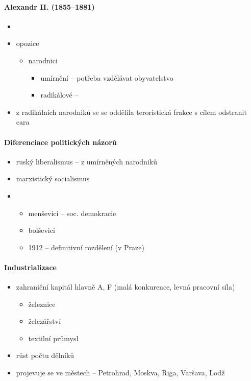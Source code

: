 \paragraph{Alexandr II. (1855--1881)}
\begin{itemize}
\item {}
\item opozice
	\begin{itemize}
	\item narodnici
		\begin{itemize}
		\item umírnění -- potřeba vzdělávat obyvatelstvo
		\item radikálové -- 
		\end{itemize}
		
	\end{itemize}
\item z radikálních narodniků se se oddělila teroristická frakce s cílem odstranit cara \ra {}
\end{itemize}

\paragraph{Diferenciace politických názorů}
\begin{itemize}
\item ruský liberalismus -- z umírněných narodniků
\item marxistický socialismus
\item {}
	\begin{itemize}
	\item menševici -- soc. demokracie
	\item bolševici
	\item 1912 -- definitivní rozdělení (v Praze)
	\end{itemize}
\end{itemize}

\paragraph{Industrializace}
\begin{itemize}
\item zahraniční kapitál hlavně A, F (malá konkurence, levná pracovní síla)
	\begin{itemize}
	\item železnice
	\item železářství
	\item textilní průmysl
	\end{itemize}
\item růst počtu dělníků
\item projevuje se ve městech -- Petrohrad, Moskva, Riga, Varšava, Lodž
\end{itemize}

